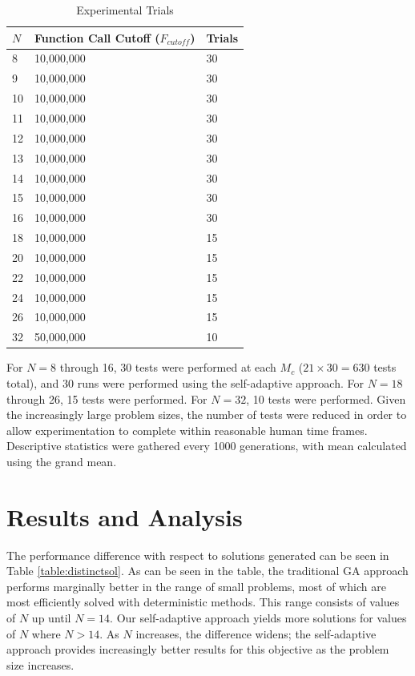 \documentclass[conference]{IEEEtran}
\begin{document}
\begin{table}\label{table:trials}
\centering
\caption{Experimental Trials}
\begin{tabular}{|l|l|l|} \hline
$N$&        Function Call Cutoff ($F_{cutoff}$)&     Trials \\ \hline
8&          10,000,000&         30 \\ \hline
9&          10,000,000&         30 \\ \hline
10&         10,000,000&         30 \\ \hline
11&         10,000,000&         30 \\ \hline
12&         10,000,000&         30 \\ \hline
13&         10,000,000&         30 \\ \hline
14&         10,000,000&         30 \\ \hline
15&         10,000,000&         30 \\ \hline
16&         10,000,000&         30 \\ \hline
18&         10,000,000&         15 \\ \hline
20&         10,000,000&         15 \\ \hline
22&         10,000,000&         15 \\ \hline
24&         10,000,000&         15 \\ \hline
26&         10,000,000&         15 \\ \hline
32&         50,000,000&         10 \\ \hline
\end{tabular}
\end{table}

For $N = 8$ through 16, 30 tests were performed at each $M_{c}$ ($21 \times 30 = 630$ tests total), and 30 runs were performed using the self-adaptive approach. For $N = 18$ through 26, 15 tests were performed. For $N = 32$, 10 tests were performed. Given the increasingly large problem sizes, the number of tests were reduced in order to allow experimentation to complete within reasonable human time frames. Descriptive statistics were gathered every 1000 generations, with mean calculated using the grand mean.

\section{Results and Analysis}
The performance difference with respect to solutions generated can be seen in Table \ref{table:distinctsol}. As can be seen in the table, the traditional GA approach performs marginally better in the range of small problems, most of which are most efficiently solved with deterministic methods. This range consists of values of $N$ up until $N = 14$. Our self-adaptive approach yields more solutions for values of $N$ where $N > 14$. As $N$ increases, the difference widens; the self-adaptive approach provides increasingly better results for this objective as the problem size increases.
\end{document}
